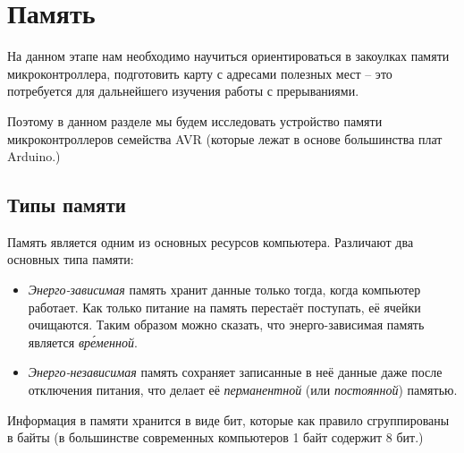 \documentclass[../sparc.tex]{subfiles}
\begin{document}
\newpage
\section{Память}

На данном этапе нам необходимо научиться ориентироваться в закоулках памяти
микроконтроллера, подготовить карту с адресами полезных мест -- это потребуется
для дальнейшего изучения работы с прерываниями.

Поэтому в данном разделе мы будем исследовать устройство памяти
микроконтроллеров семейства AVR (которые лежат в основе большинства плат
Arduino.)



\subsection{Типы памяти}

Память является одним из основных ресурсов компьютера.  Различают два основных
типа памяти:
\begin{itemize}
\item \emph{Энерго-зависимая} память хранит данные только тогда, когда компьютер
  работает.  Как только питание на память перестаёт поступать, её ячейки
  очищаются.  Таким образом можно сказать, что энерго-зависимая память является
  \emph{вр\'еменной}.
\item \emph{Энерго-независимая} память сохраняет записанные в неё данные даже
  после отключения питания, что делает её \emph{перманентной} (или
  \emph{постоянной}) памятью.
\end{itemize}

Информация в памяти хранится в виде бит, которые как правило сгруппированы в
байты (в большинстве современных компьютеров 1 байт содержит 8 бит.)
\end{document}
